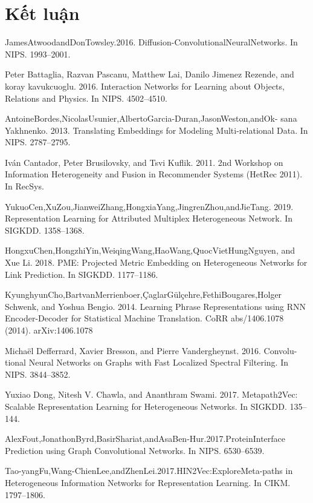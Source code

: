 \documentclass[conference]{IEEEtran}
\theoremstyle{theoremst}
\begin{document}
\section{Kết luận}


\begin{thebibliography}{00}
 JamesAtwoodandDonTowsley.2016. Diffusion-ConvolutionalNeuralNetworks. In NIPS. 1993–2001.

 Peter Battaglia, Razvan Pascanu, Matthew Lai, Danilo Jimenez Rezende, and koray kavukcuoglu. 2016. Interaction Networks for Learning about Objects, Relations and Physics. In NIPS. 4502–4510.

 AntoineBordes,NicolasUsunier,AlbertoGarcia-Duran,JasonWeston,andOk- sana Yakhnenko. 2013. Translating Embeddings for Modeling Multi-relational Data. In NIPS. 2787–2795.

 Iván Cantador, Peter Brusilovsky, and Tsvi Kuflik. 2011. 2nd Workshop on Information Heterogeneity and Fusion in Recommender Systems (HetRec 2011). In RecSys.

YukuoCen,XuZou,JianweiZhang,HongxiaYang,JingrenZhou,andJieTang. 2019. Representation Learning for Attributed Multiplex Heterogeneous Network. In SIGKDD. 1358–1368.

 HongxuChen,HongzhiYin,WeiqingWang,HaoWang,QuocVietHungNguyen, and Xue Li. 2018. PME: Projected Metric Embedding on Heterogeneous Networks for Link Prediction. In SIGKDD. 1177–1186.

KyunghyunCho,BartvanMerrienboer,ÇaglarGülçehre,FethiBougares,Holger Schwenk, and Yoshua Bengio. 2014. Learning Phrase Representations using RNN Encoder-Decoder for Statistical Machine Translation. CoRR abs/1406.1078 (2014). arXiv:1406.1078

Michaël Defferrard, Xavier Bresson, and Pierre Vandergheynst. 2016. Convolu- tional Neural Networks on Graphs with Fast Localized Spectral Filtering. In NIPS. 3844–3852.

Yuxiao Dong, Nitesh V. Chawla, and Ananthram Swami. 2017. Metapath2Vec: Scalable Representation Learning for Heterogeneous Networks. In SIGKDD. 135– 144.

 AlexFout,JonathonByrd,BasirShariat,andAsaBen-Hur.2017.ProteinInterface Prediction using Graph Convolutional Networks. In NIPS. 6530–6539.

 Tao-yangFu,Wang-ChienLee,andZhenLei.2017.HIN2Vec:ExploreMeta-paths in Heterogeneous Information Networks for Representation Learning. In CIKM. 1797–1806.


\end{thebibliography}
\end{document}
